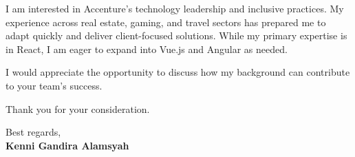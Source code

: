 \documentclass[11pt]{article}
\begin{document}
\vspace{0.3cm}

I am interested in Accenture's technology leadership and inclusive practices. My experience across real estate, gaming, and travel sectors has prepared me to adapt quickly and deliver client-focused solutions. While my primary expertise is in React, I am eager to expand into Vue.js and Angular as needed.

\vspace{0.3cm}

I would appreciate the opportunity to discuss how my background can contribute to your team's success.

\vspace{0.3cm}

Thank you for your consideration.

\vspace{0.3cm}

Best regards,\\
\textbf{Kenni Gandira Alamsyah}
\end{document}
